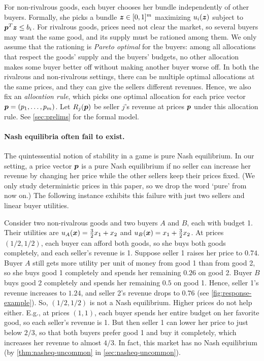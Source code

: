 For non-rivalrous goods, each buyer chooses her bundle independently of other buyers.
Formally, she picks a bundle $\bm{z} \in [0, 1]^m$
maximizing $u_i(\bm{z})$ subject to $\bm{p}^T\bm{z} \le b_i$.
For rivalrous goods, prices need not clear the market,
so several buyers may want the same good, and its supply must be rationed among them.
We only assume that the rationing is \emph{Pareto optimal} for the buyers:
among all allocations that respect the goods' supply and the buyers' budgets,
no other allocation makes some buyer better off without making another buyer worse off.
In both the rivalrous and non-rivalrous settings,
there can be multiple optimal allocations at the same prices,
and they can give the sellers different revenues.
Hence, we also fix an \emph{allocation rule},
which picks one optimal allocation for each price vector $\bm{p} = (p_1, \ldots, p_m)$.
Let $R_j(\bm{p})$ be seller $j$'s revenue at prices $\bm{p}$ under this allocation rule.
See \cref{sec:prelims} for the formal model.

\paragraph{Nash equilibria often fail to exist.}
The quintessential notion of stability in a game is pure Nash equilibrium.
In our setting, a price vector $\bm{p}$ is a pure Nash equilibrium if no seller
can increase her revenue by changing her price while the other sellers keep their prices fixed.
(We only study deterministic prices in this paper, so we drop the word `pure' from now on.)
The following instance exhibits this failure with just two sellers and linear buyer utilities.

\begin{example}
\label{ex:intro-no-nash}
Consider two non-rivalrous goods and two buyers $A$ and $B$, each with budget 1.
Their utilities are $u_A(\bm{x}) = \frac{3}{2}x_1 + x_2$ and $u_B(\bm{x}) = x_1 + \frac{3}{2}x_2$.
At prices $(1/2, 1/2)$, each buyer can afford both goods, so she buys both goods completely,
and each seller's revenue is 1.
Suppose seller 1 raises her price to $0.74$.
Buyer $A$ still gets more utility per unit of money from good 1 than from good 2,
so she buys good 1 completely and spends her remaining $0.26$ on good 2.
Buyer $B$ buys good 2 completely and spends her remaining $0.5$ on good 1.
Hence, seller 1's revenue increases to $1.24$, and seller 2's revenue drops to $0.76$
(see \cref{fig:response-example}).
So, $(1/2, 1/2)$ is not a Nash equilibrium.
Higher prices do not help either.
E.g., at prices $(1, 1)$, each buyer spends her entire budget on her favorite good,
so each seller's revenue is 1.
But then seller 1 can lower her price to just below $2/3$,
so that both buyers prefer good 1 and buy it completely,
which increases her revenue to almost $4/3$.
In fact, this market has no Nash equilibrium
(by \cref{thm:nasheq-uncommon} in \cref{sec:nasheq-uncommon}).
\end{example}

